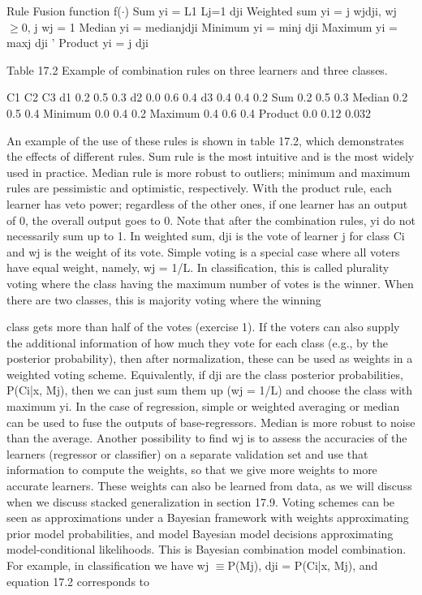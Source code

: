 Rule Fusion function f($\cdot$) Sum yi = L1 Lj=1 dji Weighted sum yi = j wjdji, wj $\geq$0, j wj = 1 Median yi = medianjdji Minimum yi = minj dji Maximum yi = maxj dji ' Product yi = j dji

Table 17.2 Example of combination rules on three learners and three classes.

C1 C2 C3 d1 0.2 0.5 0.3 d2 0.0 0.6 0.4 d3 0.4 0.4 0.2 Sum 0.2 0.5 0.3 Median 0.2 0.5 0.4 Minimum 0.0 0.4 0.2 Maximum 0.4 0.6 0.4 Product 0.0 0.12 0.032

An example of the use of these rules is shown in table 17.2, which demonstrates the effects of different rules. Sum rule is the most intuitive and is the most widely used in practice. Median rule is more robust to outliers; minimum and maximum rules are pessimistic and optimistic, respectively. With the product rule, each learner has veto power; regardless of the other ones, if one learner has an output of 0, the overall output goes to 0. Note that after the combination rules, yi do not necessarily sum up to 1. In weighted sum, dji is the vote of learner j for class Ci and wj is the weight of its vote. Simple voting is a special case where all voters have equal weight, namely, wj = 1/L. In classification, this is called plurality voting where the class having the maximum number of votes is the winner. When there are two classes, this is majority voting where the winning

class gets more than half of the votes (exercise 1). If the voters can also supply the additional information of how much they vote for each class (e.g., by the posterior probability), then after normalization, these can be used as weights in a weighted voting scheme. Equivalently, if dji are the class posterior probabilities, P(Ci|x, Mj), then we can just sum them up (wj = 1/L) and choose the class with maximum yi. In the case of regression, simple or weighted averaging or median can be used to fuse the outputs of base-regressors. Median is more robust to noise than the average. Another possibility to find wj is to assess the accuracies of the learners (regressor or classifier) on a separate validation set and use that information to compute the weights, so that we give more weights to more accurate learners. These weights can also be learned from data, as we will discuss when we discuss stacked generalization in section 17.9. Voting schemes can be seen as approximations under a Bayesian framework with weights approximating prior model probabilities, and model Bayesian model decisions approximating model-conditional likelihoods. This is Bayesian combination model combination. For example, in classification we have wj $\equiv$P(Mj), dji = P(Ci|x, Mj), and equation 17.2 corresponds to

